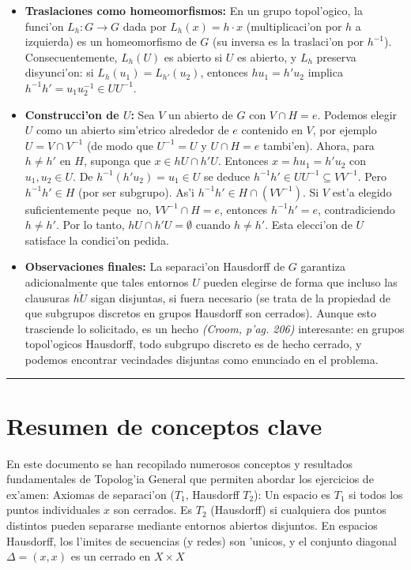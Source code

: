 \documentclass[a4paper,11pt]{article}  %
\begin{document}
\begin{enumerate}
\begin{itemize}
\item \textbf{Traslaciones como homeomorfismos:} En un grupo topol'ogico, la funci'on $L_h: G\to G$ dada por $L_h(x)=h\cdot x$ (multiplicaci'on por $h$ a izquierda) es un homeomorfismo de $G$ (su inversa es la traslaci'on por $h^{-1}$). Consecuentemente, $L_h(U)$ es abierto si $U$ es abierto, y $L_h$ preserva disyunci'on: si $L_{h}(u_1)=L_{h'}(u_2)$, entonces $h u_1 = h' u_2$ implica $h^{-1}h' = u_1 u_2^{-1}\in U U^{-1}$.
\item \textbf{Construcci'on de $U$:} Sea $V$ un abierto de $G$ con $V\cap H={e}$. Podemos elegir $U$ como un abierto sim'etrico alrededor de $e$ contenido en $V$, por ejemplo $U=V\cap V^{-1}$ (de modo que $U^{-1}=U$ y $U\cap H={e}$ tambi'en). Ahora, para $h\neq h'$ en $H$, suponga que $x\in hU \cap h'U$. Entonces $x = h u_1 = h' u_2$ con $u_1,u_2\in U$. De $h^{-1}(h'u_2) = u_1 \in U$ se deduce $h^{-1}h' \in U U^{-1} \subseteq V V^{-1}$. Pero $h^{-1}h' \in H$ (por ser subgrupo). As'i $h^{-1}h'\in H\cap (V V^{-1})$. Si $V$ est'a elegido suficientemente peque~no, $VV^{-1}\cap H={e}$, entonces $h^{-1}h'=e$, contradiciendo $h\neq h'$. Por lo tanto, $hU \cap h'U = \emptyset$ cuando $h\neq h'$. Esta elecci'on de $U$ satisface la condici'on pedida.
\item \textbf{Observaciones finales:} La separaci'on Hausdorff de $G$ garantiza adicionalmente que tales entornos $U$ pueden elegirse de forma que incluso las clausuras $\overline{hU}$ sigan disjuntas, si fuera necesario (se trata de la propiedad de que subgrupos discretos en grupos Hausdorff son cerrados). Aunque esto trasciende lo solicitado, es un hecho \emph{(Croom, p'ag. 206)} interesante: en grupos topol'ogicos Hausdorff, todo subgrupo discreto es de hecho cerrado, y podemos encontrar vecindades disjuntas como enunciado en el problema.
\end{itemize}
\end{enumerate} \bigskip\hrule\bigskip \section*{Resumen de conceptos clave}
En este documento se han recopilado numerosos conceptos y resultados fundamentales de Topolog'ia General que permiten abordar los ejercicios de ex'amen:
Axiomas de separaci'on ($T_1$, Hausdorff $T_2$): Un espacio es $T_1$ si todos los puntos individuales ${x}$ son cerrados. Es $T_2$ (Hausdorff) si cualquiera dos puntos distintos pueden separarse mediante entornos abiertos disjuntos. En espacios Hausdorff, los l'imites de secuencias (y redes) son 'unicos, y el conjunto diagonal $\Delta={(x,x)}$ es un cerrado en $X\times X$
\end{document}
